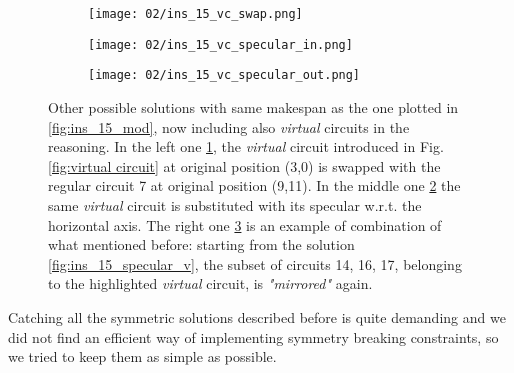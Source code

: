         \begin{figure}[H]
            \centering
            \begin{subfigure}[b]{0.3\textwidth}
                \centering 
                \texttt{[image: 02/ins\_15\_vc\_swap.png]}
                \caption{}
                \label{fig:vc_swap}
            \end{subfigure}
            \hfill
            \begin{subfigure}[b]{0.3\textwidth}
                \centering
                \texttt{[image: 02/ins\_15\_vc\_specular\_in.png]}
                \caption{}
                \label{fig:vc_specular_in}
            \end{subfigure}
            \hfill
            \begin{subfigure}[b]{0.3\textwidth}
                \centering
                \texttt{[image: 02/ins\_15\_vc\_specular\_out.png]}
                \caption{}
                \label{fig:vc_specular_out}
            \end{subfigure}
            \caption{
                Other possible solutions with same makespan as the one plotted in \ref{fig:ins_15_mod},
                now including also \textit{virtual} circuits in the reasoning.
                In the left one \ref{fig:vc_swap}, the \textit{virtual} circuit introduced in Fig.\ref{fig:virtual circuit}
                at original position (3,0) is swapped with the regular circuit 7 at original position (9,11).
                In the middle one \ref{fig:vc_specular_in} the same \textit{virtual} circuit is substituted with 
                its specular w.r.t. the horizontal axis.
                The right one \ref{fig:vc_specular_out} is an example of combination of what mentioned before:
                starting from the solution \ref{fig:ins_15_specular_v}, the subset of circuits 14, 16, 17, belonging to 
                the highlighted \textit{virtual} circuit, is \textit{"mirrored"} again.
            }
            \label{fig:symmetry_vc}
        \end{figure}

        Catching all the symmetric solutions described before is quite demanding and we did not find an 
        efficient way of implementing symmetry breaking constraints, so we tried to keep them as simple 
        as possible.

